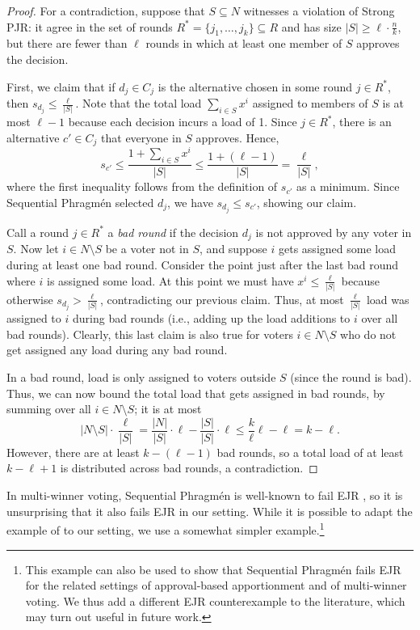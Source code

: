 \documentclass[10pt]{scrartcl}
\theoremstyle{plain}
\theoremstyle{definition}
\renewcommand*{\le}{\leqslant}
\renewcommand*{\leq}{\leqslant}
\renewcommand*{\ge}{\geqslant}
\begin{document}
\begin{proof}
For a contradiction, suppose that $S \subseteq N$ witnesses a violation of Strong PJR: it agree in the set of rounds $R^* = \{j_1, \dots, j_k\} \subseteq R$ and has size $|S| \ge \ell \cdot \frac{n}{k}$, but there are fewer than $\ell$ rounds in which at least one member of $S$ approves the decision.

First, we claim that if $d_j \in C_j$ is the alternative chosen in some round $j \in R^*$, then $s_{d_j} \leq \frac{\ell }{|S|}$. Note that the total load $\sum_{i \in S} x^i$ assigned to members of $S$ is at most $\ell - 1$ because each decision incurs a load of 1. Since $j\in R^*$, there is an alternative $c' \in C_j$ that everyone in $S$ approves. Hence, 
\[
s_{c'} \leq \frac{1 + \sum_{i \in S}x^i}{|S|} \leq \frac{1 + (\ell-1)}{|S|} = \frac{\ell}{|S|},
\]
where the first inequality follows from the definition of $s_{c'}$ as a minimum. Since Sequential Phragm\'en selected $d_j$, we have $s_{d_j} \le s_{c'}$, showing our claim.

Call a round $j \in R^*$ a \emph{bad round} if the decision $d_j$ is not approved by any voter in $S$.
Now let $i \in N \setminus S$ be a voter not in $S$, and suppose $i$ gets assigned some load during at least one bad round. Consider the point just after the last bad round where $i$ is assigned some load. 
At this point we must have $x^i \le \frac{\ell }{|S|}$ because otherwise $s_{d_j} > \frac{\ell }{|S|}$, contradicting our previous claim. 
Thus, at most $\frac{\ell }{|S|}$ load was assigned to $i$ during bad rounds (i.e., adding up the load additions to $i$ over all bad rounds). 
Clearly, this last claim is also true for voters $i \in N \setminus S$ who do not get assigned any load during any bad round.

In a bad round, load is only assigned to voters outside $S$ (since the round is bad). Thus, we can now bound the total load that gets assigned in bad rounds, by summing over all $i \in N\setminus S$; it is at most
\[
\textstyle
|N \setminus S| \cdot  \frac{\ell}{|S|}  = \frac{|N|}{|S|}\cdot \ell - \frac{|S|}{|S|}\cdot \ell \leq \frac{k}{\ell}\ell - \ell = k - \ell.
\]
However, there are at least $k - (\ell - 1)$ bad rounds, so a total load of at least $k - \ell + 1$ is distributed across bad rounds, a contradiction.
\end{proof}

In multi-winner voting, Sequential Phragm\'en is well-known to fail EJR \citep{brill2023phragmen}, so it is unsurprising that it also fails EJR in our setting. While it is possible to adapt the example of \citet{brill2023phragmen} to our setting, we use a somewhat simpler example.\footnote{This example can also be used to show that Sequential Phragm\'en fails EJR for the related settings of approval-based apportionment and of multi-winner voting. We thus add a different EJR counterexample to the literature, which may turn out useful in future work.}
\end{document}
